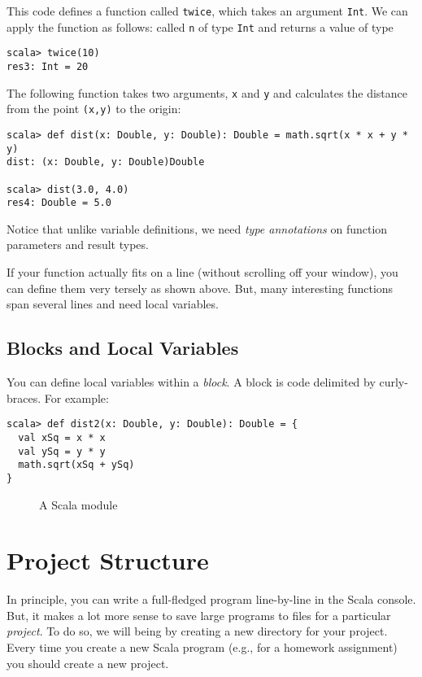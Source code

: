 \documentclass[9pt]{extbook}
\begin{document}
\lstset{language=scala}
This code defines a function called \lstinline|twice|, which takes an argument
\lstinline|Int|. We can apply the function as follows:
called \lstinline|n| of type \lstinline|Int| and returns a value of type
\lstset{language=console}
\begin{lstlisting}
scala> twice(10)
res3: Int = 20
\end{lstlisting}
\lstset{language=scala}
The following function takes two arguments, \lstinline|x| and \lstinline|y| and calculates the
distance from the point \lstinline|(x,y)| to the origin:
\begin{lstlisting}
scala> def dist(x: Double, y: Double): Double = math.sqrt(x * x + y * y)
dist: (x: Double, y: Double)Double

scala> dist(3.0, 4.0)
res4: Double = 5.0
\end{lstlisting}

Notice that unlike variable definitions, we need \emph{type annotations}
on function parameters and result types.

If your function actually fits on a line (without scrolling off your window),
you can define them very tersely as shown above. But, many interesting
functions span several lines and need local variables.

\subsection{Blocks and Local Variables}

You can define local variables within a \emph{block}. A block is code delimited by
curly-braces. For example:

\begin{lstlisting}
scala> def dist2(x: Double, y: Double): Double = {
  val xSq = x * x
  val ySq = y * y
  math.sqrt(xSq + ySq)
}
\end{lstlisting}

\begin{figure}
\caption{A Scala module}
\label{lecture1code}
\end{figure}

\section{\sbt{} Project Structure}
\lstset{language=console}
In principle, you can write a full-fledged program line-by-line in the Scala
console. But, it makes a lot more sense to save large programs to files
for a particular \emph{project}. To do so, we will being by creating a new directory
for your project. Every time you create a new Scala program (e.g., for a homework
assignment) you should create a new project.
\end{document}
